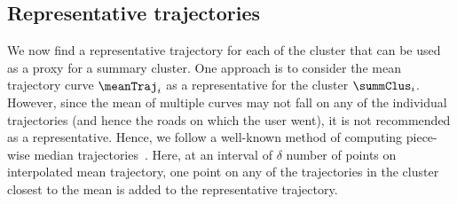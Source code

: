 \subsection{Representative trajectories}
We now find a representative trajectory for each of the cluster that can be used as a proxy for a summary cluster. One approach is to consider the mean trajectory curve $\meanTraj_i$ as a representative for the cluster $\summClus_i$. However, since the mean of multiple curves may not fall on any of the individual trajectories (and hence the roads on which the user went), it is not recommended as a representative. Hence, we follow a well-known method of computing piece-wise median trajectories~\cite{median1}. Here, at an interval of $\delta$ number of points on interpolated mean trajectory, one point on any of the trajectories in the cluster closest to the mean is added to the representative trajectory. 

